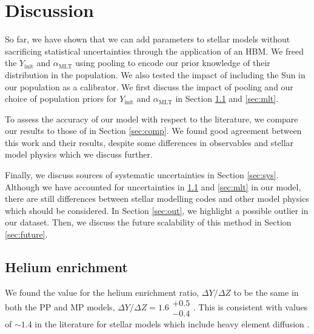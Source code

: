 \documentclass[a4paper,fleqn,usenatbib]{mnras}
\newcommand{\mlt}{\ensuremath{{\alpha_\mathrm{MLT}}}}
\begin{document}
\section{Discussion}\label{sec:dis}

So far, we have shown that we can add parameters to stellar models without sacrificing statistical uncertainties through the application of an HBM. We freed the $Y_\mathrm{init}$ and $\mlt$ using pooling to encode our prior knowledge of their distribution in the population. We also tested the impact of including the Sun in our population as a calibrator. We first discuss the impact of pooling and our choice of population priors for $Y_\mathrm{init}$ and $\mlt$ in Section \ref{sec:helium} and \ref{sec:mlt}.

To assess the accuracy of our model with respect to the literature, we compare our results to those of  in Section \ref{sec:comp}. We found good agreement between this work and their results, despite some differences in observables and stellar model physics which we discuss further.

Finally, we discuss sources of systematic uncertainties in Section \ref{sec:sys}. Although we have accounted for uncertainties in \ref{sec:helium} and \ref{sec:mlt} in our model, there are still differences between stellar modelling codes and other model physics which should be considered. In Section \ref{sec:out}, we highlight a possible outlier in our dataset. Then, we discuss the future scalability of this method in Section \ref{sec:future}.

\subsection{Helium enrichment}\label{sec:helium}

We found the value for the helium enrichment ratio, $\Delta Y / \Delta Z$ to be the same in both the PP and MP models, $\Delta Y / \Delta Z = 1.6\substack{+0.5\\-0.4}$. This is consistent with values of $\sim 1.4$ in the literature for stellar models which include heavy element diffusion \citep{Brogaard.VandenBerg.ea2012, Verma.Raodeo.ea2019}.
\end{document}
